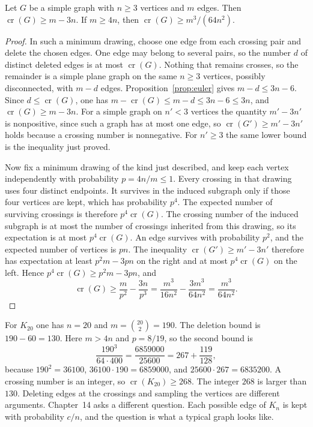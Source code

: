 \begin{proposition}[crossings]\label{prop:crossing}
Let $G$ be a simple graph with $n\ge3$ vertices and $m$ edges. Then $\operatorname{cr}(G)\ge m-3n$. If $m\ge4n$, then $\operatorname{cr}(G)\ge m^3/(64n^2)$.
\end{proposition}
\begin{proof}
In such a minimum drawing, choose one edge from each crossing pair and delete the chosen edges. One edge may belong to several pairs, so the number $d$ of distinct deleted edges is at most $\operatorname{cr}(G)$. Nothing that remains crosses, so the remainder is a simple plane graph on the same $n\ge3$ vertices, possibly disconnected, with $m-d$ edges. Proposition~\ref{prop:euler} gives $m-d\le3n-6$. Since $d\le\operatorname{cr}(G)$, one has $m-\operatorname{cr}(G)\le m-d\le3n-6\le3n$, and $\operatorname{cr}(G)\ge m-3n$. For a simple graph on $n'<3$ vertices the quantity $m'-3n'$ is nonpositive, since such a graph has at most one edge, so $\operatorname{cr}(G')\ge m'-3n'$ holds because a crossing number is nonnegative. For $n'\ge3$ the same lower bound is the inequality just proved.

Now fix a minimum drawing of the kind just described, and keep each vertex independently with probability $p=4n/m\le1$. Every crossing in that drawing uses four distinct endpoints. It survives in the induced subgraph only if those four vertices are kept, which has probability $p^4$. The expected number of surviving crossings is therefore $p^4\operatorname{cr}(G)$. The crossing number of the induced subgraph is at most the number of crossings inherited from this drawing, so its expectation is at most $p^4\operatorname{cr}(G)$. An edge survives with probability $p^2$, and the expected number of vertices is $pn$. The inequality $\operatorname{cr}(G')\ge m'-3n'$ therefore has expectation at least $p^2 m-3pn$ on the right and at most $p^4\operatorname{cr}(G)$ on the left. Hence $p^4\operatorname{cr}(G)\ge p^2 m-3pn$, and
\[
 \operatorname{cr}(G)\ge\frac{m}{p^2}-\frac{3n}{p^3}=\frac{m^3}{16n^2}-\frac{3m^3}{64n^2}=\frac{m^3}{64n^2}.
\]
\end{proof}

For $K_{20}$ one has $n=20$ and $m=\binom{20}{2}=190$. The deletion bound is $190-60=130$. Here $m>4n$ and $p=8/19$, so the second bound is
\[
 \frac{190^3}{64\cdot400}=\frac{6859000}{25600}=267+\frac{119}{128},
\]
because $190^2=36100$, $36100\cdot190=6859000$, and $25600\cdot267=6835200$. A crossing number is an integer, so $\operatorname{cr}(K_{20})\ge268$. The integer $268$ is larger than $130$. Deleting edges at the crossings and sampling the vertices are different arguments. Chapter~14 asks a different question. Each possible edge of $K_n$ is kept with probability $c/n$, and the question is what a typical graph looks like.

